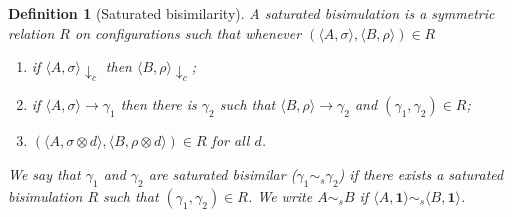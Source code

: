 \documentclass[preprint,12pt]{elsarticle}
\newtheorem{definition}{Definition}
\def\monid{{\mathbf 0}}
\def\monid{\mathbf{1}}
\begin{document}
\begin{definition}[Saturated bisimilarity]\label{def:strongsb} A saturated bisimulation is a symmetric relation $R$ on configurations such that whenever
	$( \langle A, \sigma \rangle,\langle B, \rho \rangle) \in R$
	\begin{enumerate}
		\item if $\langle A, \sigma \rangle \downarrow_c$ then $\langle B, \rho \rangle \downarrow_c$;
		\item if $\langle A, \sigma \rangle \to \gamma_1$ then there is $\gamma_2$ such that $\langle B, \rho \rangle \to \gamma_2$ and $(\gamma_1, \gamma_2) \in R$;
		\item $(\langle A,\sigma \otimes d\rangle, \langle B,\rho \otimes d \rangle) \in R$ for  all $d$.
	\end{enumerate}
	We say that $\gamma_1$ and $\gamma_2$ are  saturated bisimilar ($\gamma_1  \sim_{\mathit{s}} \gamma_2$) if there exists a  saturated  bisimulation $R$ such that $(\gamma_1 , \gamma_2 ) \in R$. We write $A \sim_{\mathit{s}} B$ if $\langle A, \monid \rangle \sim_{\mathit{s}} \langle B, \monid \rangle$.
\end{definition}
\end{document}

